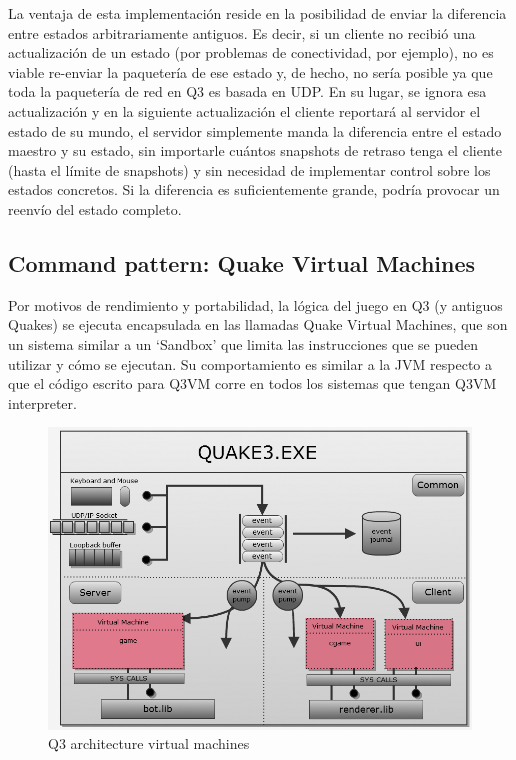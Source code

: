 \documentclass[a4paper,12pt]{report}
\begin{document}
	La ventaja de esta implementación reside en la posibilidad de enviar la diferencia entre estados arbitrariamente antiguos. Es decir, si un cliente no recibió una actualización de un estado (por problemas de conectividad, por ejemplo), no es viable re-enviar la paquetería de ese estado y, de hecho, no sería posible ya que toda la paquetería de red en Q3 es basada en UDP. En su lugar, se ignora esa actualización y en la siguiente actualización el cliente reportará al servidor el estado de su mundo, el servidor simplemente manda la diferencia entre el estado maestro y su estado, sin importarle cuántos snapshots de retraso tenga el cliente (hasta el límite de snapshots) y sin necesidad de implementar control sobre los estados concretos. Si la diferencia es suficientemente grande, podría provocar un reenvío del estado completo.\\

	\subsection{Command pattern: Quake Virtual Machines}
	
	Por motivos de rendimiento y portabilidad, la lógica del juego en Q3 (y antiguos Quakes) se ejecuta encapsulada en las llamadas Quake Virtual Machines, que son un sistema similar a un `Sandbox' que limita las instrucciones que se pueden utilizar y cómo se ejecutan. Su comportamiento es similar a la JVM respecto a que el código escrito para Q3VM corre en todos los sistemas que tengan Q3VM interpreter. \cite{q3vm}\\
	
	\begin{center}
		\begin{figure}[h]
			\includegraphics[width=1\textwidth]{images/q3_workspace_architecture}
			\caption{Q3 architecture virtual machines}
			\label{figq3vm}
		\end{figure}
	\end{center}
	
\end{document}
